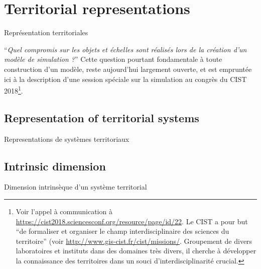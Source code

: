 

\newpage

\section{Territorial representations}{Représentation territoriales}





``\textit{Quel compromis sur les objets et échelles sont réalisés lors de la création d'un modèle de simulation ?}'' Cette question pourtant fondamentale à toute construction d'un modèle, reste aujourd'hui largement ouverte, et est empruntée ici à la description d'une session spéciale sur la simulation au congrès du CIST 2018\footnote{Voir l'appel à communication à \url{https://cist2018.sciencesconf.org/resource/page/id/22}. Le CIST a pour but ``de formaliser et organiser le champ interdisciplinaire des sciences du territoire'' (voir \url{http://www.gis-cist.fr/cist/missions/}. Groupement de divers laboratoires et instituts dans des domaines très divers, il cherche à développer la connaissance des territoires dans un souci d'interdisciplinarité crucial.}.


\subsection{Representation of territorial systems}{Representations de systèmes territoriaux}





\subsection{Intrinsic dimension}{Dimension intrinsèque d'un système territorial}




